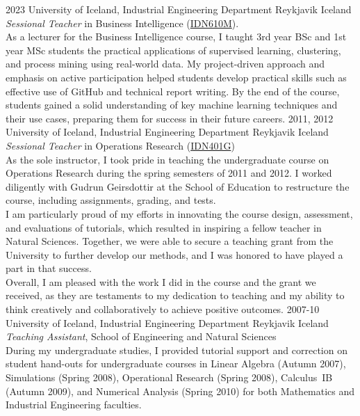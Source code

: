 \begin{entrylist}
\entry
{2023}
{University of Iceland, Industrial Engineering Department}
{Reykjavik Iceland}
{\emph{Sessional Teacher} in Business Intelligence (\href{https://ugla.hi.is/kennsluskra/index.php?tab=nam&chapter=namskeid&id=71001420230}{IDN610M}). \\
As a lecturer for the Business Intelligence course, I taught 3rd year BSc and 1st year MSc students the practical applications of supervised learning, clustering, and process mining using real-world data. My project-driven approach and emphasis on active participation helped students develop practical skills such as effective use of GitHub and technical report writing. By the end of the course, students gained a solid understanding of key machine learning techniques and their use cases, preparing them for success in their future careers.
}
\entry
{2011, 2012}
{University of Iceland, Industrial Engineering Department}
{Reykjavik Iceland}
{\emph{Sessional Teacher} in Operations Research (\href{https://ugla.hi.is/kennsluskra/index.php?sid=&tab=nam&chapter=namskeid&id=08213020110}{IDN401G})\\
As the sole instructor, I took pride in teaching the undergraduate course on Operations Research during the spring semesters of 2011 and 2012. I worked diligently with Gudrun Geirsdottir at the School of Education to restructure the course, including assignments, grading, and tests.\\
I am particularly proud of my efforts in innovating the course design, assessment, and evaluations of tutorials, which resulted in inspiring a fellow teacher in Natural Sciences. Together, we were able to secure a teaching grant from the University to further develop our methods, and I was honored to have played a part in that success.\\
Overall, I am pleased with the work I did in the course and the grant we received, as they are testaments to my dedication to teaching and my ability to think creatively and collaboratively to achieve positive outcomes.
}	
\entry
{2007-10}
{University of Iceland, Industrial Engineering Department}
{Reykjavik Iceland}
{\emph{Teaching Assistant}, School of Engineering and Natural Sciences \\
During my undergraduate studies, I provided tutorial support and correction on student hand-outs for undergraduate courses in Linear Algebra (Autumn 2007), Simulations (Spring 2008), Operational Research (Spring 2008), Calculus~IB (Autumn 2009), and Numerical Analysis (Spring 2010) for both Mathematics and Industrial Engineering faculties.}
\end{entrylist}   
